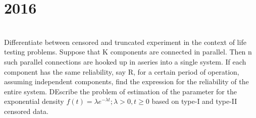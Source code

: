 \section*{2016}
\vspace{-.5cm}
\hrulefill \smallskip\\
 Differentiate between censored and truncated experiment in the context of life testing problems.
\myline
{} Suppose that K components are connected in parallel. Then n such parallel connections are hooked up in aseries into a single system. If each component has the same reliability, say R, for a certain period of operation, assuming independent components, find the expression for the reliability of the entire system.
\myline
{} DEscribe the problem of estimation of the parameter for the exponential density $f(t) = \lambda e^{-\lambda t};\lambda >0,t\geq0$ based on type-I and type-II censored data.